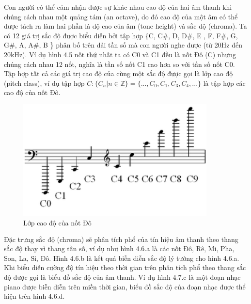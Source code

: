 \documentclass[a4paper, 12pt]{article}
\begin{document}
Con người có thể cảm nhận được sự khác nhau cao độ của hai âm thanh khi chúng cách nhau một quảng tám (an octave), do đó cao độ của một âm có thể được tách ra làm hai phần là độ cao của âm (tone height) và sắc độ (chroma). Ta có 12 giá trị sắc độ được biểu diễn bởi tập hợp \{C, C\#, D, D\#, E , F, F\#, G, G\#, A, A\#, B \} phân bố trên dải tần số mà con người nghe được (từ 20Hz đến 20kHz). Ví dụ hình 4.5 nốt thứ nhất ta có C0 và C1 đều là nốt Đô (C) nhưng chúng cách nhau 12 nốt, nghĩa là tần số nốt C1 cao hơn so với tần số nốt C0. Tập hợp tất cả các giá trị cao độ của cùng một sắc độ được gọi là lớp cao độ (pitch class), ví dụ tập hợp $C: \{ C_n| n \in \mathbb{Z} \} = \{..., C_0, C_1, C_3, C_4, ... \}$ là tập hợp các cao độ của nốt Đô. 
\begin{figure}[!h]
\captionsetup{width=0.8\textwidth}
\centering
\includegraphics[width=10cm]{images/4.9.png}
\caption{Lớp cao độ của nốt Đô}
\end{figure}

\noindent
Đặc trưng sắc độ (chroma) sẽ phân tích phổ của tín hiệu âm thanh theo thang sắc độ thay vì thang tần số, ví dụ như hình 4.6.a là các nốt Đô, Rê, Mi, Pha, Son, La, Si, Đô. Hình 4.6.b là kết quả biễn diễn sắc độ lý tưởng cho hình 4.6.a. Khi biểu diễn cường độ tín hiệu theo thời gian trên phân tích phổ theo thang sắc độ được gọi là biểu đồ sắc độ của âm thanh. Ví dụ hình 4.7.c là một đoạn nhạc piano được biễn diễn trên miền thời gian, biểu đồ sắc độ của đoạn nhạc được thể hiện trên hình 4.6.d. 
\end{document}
